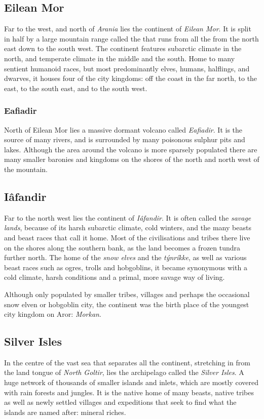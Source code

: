 \subsection{Eilean Mor}
\label{sec:Eilean Mor}

Far to the west, and north of \emph{Arania} lies the continent of \emph{Eilean
  Mor}. It is split in half by a large mountain range called the
 that runs from all the from the north east down to
the south west.  The continent features subarctic climate in the north, and
temperate climate in the middle and the south. Home to many sentient humanoid
races, but most predominantly elves, humans, halflings, and dwarves, it houses
four of the city kingdoms:  off the coast in the far
north,  to the east,  to the
south east, and  to the south west.

\subsubsection{Eafiadir}
\label{sec:Eafiadir}

North of Eilean Mor lies a massive dormant volcano called \emph{Eafiadir}. It
is the source of many rivers, and is surrounded by many poisonous sulphur pits
and lakes. Although the area around the volcano is more sparsely populated
there are many smaller baronies and kingdoms on the shores of the north and
north west of the mountain.

\subsection{Iâfandir}
\label{sec:Iafandir}

Far to the north west lies the continent of \emph{Iâfandir}. It is often called
the \emph{savage lands}, because of its harsh subarctic climate, cold winters,
and the many beasts and beast races that call it home. Most of the civilisations
and tribes there live on the shores along the southern bank, as the land becomes
a frozen tundra further north. The home of the \emph{snow elves} and the
\emph{týnríkke}, as well as various beast races such as ogres, trolls and
hobgoblins, it became synonymous with a cold climate, harsh conditions and a
primal, more savage way of living.

Although only populated by smaller tribes, villages and perhaps the occasional
snow elven or hobgoblin city, the continent was the birth place of the youngest
city kingdom on Aror: \emph{Morkan}.

\subsection{Silver Isles}

In the centre of the vast sea that separates all the continent, stretching in
from the land tongue of \emph{North Goltir}, lies the archipelago called the
\emph{Silver Isles}. A huge network of thousands of smaller islands and inlets,
which are mostly covered with rain forests and jungles. It is the native home
of many beasts, native tribes as well as newly settled villages and expeditions
that seek to find what the islands are named after: mineral riches.
